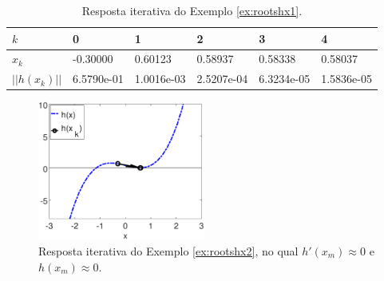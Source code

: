 \begin{table}[!h]
\centering
\begin{tabular}{|l|l|l|l|l|l|}
\hline
$k$      & 0 & 1 & 2 & 3 & 4 \\ \hline
$x_k$    & -0.30000 & 0.60123 & 0.58937 & 0.58338 & 0.58037 \\ \hline
$||h(x_k)||$ & 6.5790e-01 & 1.0016e-03 & 2.5207e-04 & 6.3234e-05 & 1.5836e-05 \\ \hline
\end{tabular}
\caption{Resposta iterativa do Exemplo \ref{ex:rootshx1}.}
\label{tab:rootsNcases3}
\end{table}

    \begin{figure}[!h]
        \centering
        \includegraphics[width=0.49\textwidth]{chapters/roots/mfiles/hx2/minimizando_hx_1.eps}
        \caption{Resposta iterativa do Exemplo \ref{ex:rootshx2}, no qual $h'(x_m)\approx 0$ e $h(x_m)\approx 0$.}
        \label{fig:rootsNcasesc}
    \end{figure}

